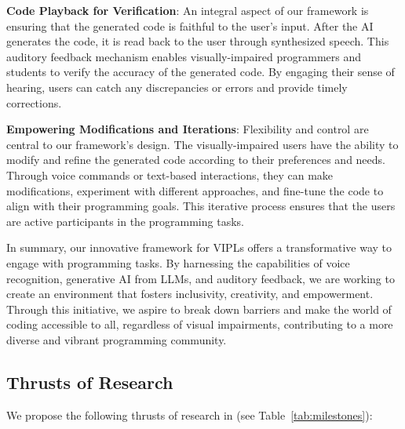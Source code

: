 {\bf Code Playback for Verification}: An integral aspect of our
framework is ensuring that the generated code is faithful to the
user's input. After the AI generates the code, it is read back to the
user through synthesized speech. This auditory feedback mechanism
enables visually-impaired programmers and students to verify the
accuracy of the generated code. By engaging their sense of hearing,
users can catch any discrepancies or errors and provide timely
corrections.

  
{\bf Empowering Modifications and Iterations}: Flexibility and control
are central to our framework's design. The visually-impaired users
have the ability to modify and refine the generated code according to
their preferences and needs. Through voice commands or text-based
interactions, they can make modifications, experiment with different
approaches, and fine-tune the code to align with their programming
goals. This iterative process ensures that the users are active
participants in the programming tasks.

In summary, our innovative framework for VIPLs offers a transformative
way to engage with programming tasks. By harnessing the capabilities
of voice recognition, generative AI from LLMs, and auditory feedback,
we are working to create an environment that fosters inclusivity,
creativity, and empowerment. Through this initiative, we aspire to
break down barriers and make the world of coding accessible to all,
regardless of visual impairments, contributing to a more diverse and
vibrant programming community.

\subsection{Thrusts of Research}

We propose the following thrusts of research in {\tool} (see Table~\ref{tab:milestones}):


